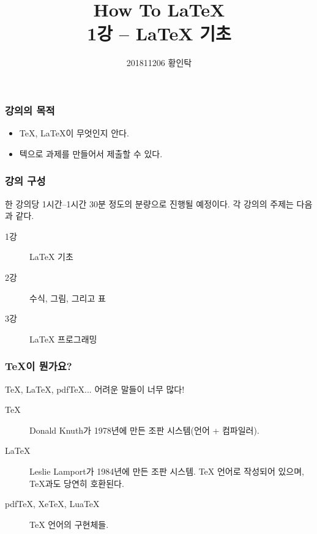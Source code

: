 

\usepackage{subfig}

\usepackage{tikz, pgfplots}
\usepackage{tkz-euclide}
\usepackage[american, cuteinductors]{circuitikz}
\usepackage{schemabloc}
\pgfplotsset{compat=newest}
\tikzexternalize

\usepackage{minted}

\title{How To LaTeX \\ \normalsize \textnormal{1강 -- LaTeX 기초}}
\author{201811206 황인탁}


\maketitle

\begin{frame}
    \frametitle{강의의 목적}

    \begin{itemize}
        \item TeX, LaTeX이 무엇인지 안다.
        \item 텍으로 과제를 만들어서 제출할 수 있다.
    \end{itemize}

\end{frame}

\begin{frame}
    \frametitle{강의 구성}

    한 강의당 1시간--1시간 30분 정도의 분량으로 진행될 예정이다. 각 강의의 주제는 다음과 같다.

    \begin{description}
        \item[1강] LaTeX 기초
        \item[2강] 수식, 그림, 그리고 표
        \item[3강] LaTeX 프로그래밍
    \end{description}

\end{frame}

\begin{frame}
    \frametitle{TeX이 뭔가요?}

    TeX, LaTeX, pdfTeX... 어려운 말들이 너무 많다!

    \begin{description}
        \item[TeX] Donald Knuth가 1978년에 만든 조판 시스템(언어 + 컴파일러).
        \item[LaTeX] Leslie Lamport가 1984년에 만든 조판 시스템. TeX 언어로 작성되어 있으며, TeX과도 당연히 호환된다.
        \item[pdfTeX, XeTeX, LuaTeX] TeX 언어의 구현체들.
    \end{description}

\end{frame}

